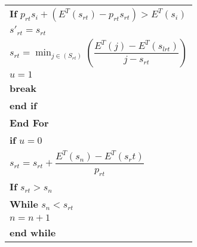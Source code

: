 \begin{table}
\begin{minipage}[b]{8cm}
\begin{tabular}{p{7cm}}
\hspace{7mm}\textbf{If} $p_{rt}s_i + (E^T(s_{rt}) - p_{rt}s_{rt}) > E^T(s_i)$
\\
\hspace{10mm}$s'_{rt} = s_{rt}$
\\
\hspace{10mm}$s_{rt} = \displaystyle \min_{j\in(S_{rt})}(\dfrac{E^T(j)-E^T(s_{lrt})}{j-s_{rt}})$
\\
\hspace{10mm}$u=1$
\\
\hspace{10mm}\textbf{break}
\\
\hspace{7mm}\textbf{end if}
\\
\hspace{4mm}\textbf{End For}
\\
\hspace{4mm}\textbf{if} $u=0$
\\
\hspace{7mm} $s_{rt} = s_{rt} + \dfrac{E^T(s_n)-E^T(s_rt)}{p_{rt}}$
\\
\hspace{7mm}\textbf{If} $s_{rt}>s_{n}$
\\
\hspace{10mm}\textbf{While} $s_n < s_{rt}$
\\
\hspace{13mm} $n=n+1$
\\
\hspace{10mm} \textbf{end while}
\\

\end{tabular}
\end{minipage}
\end{table}
